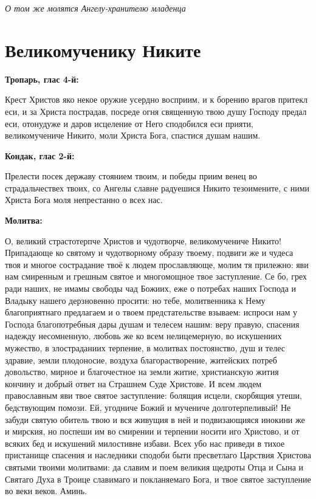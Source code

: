 \itshape О том же молятся Ангелу-хранителю младенца\normalfont{} 




 

\section{Великомученику Никите}
 
\bfseries Тропарь, глас 4-й:\normalfont{}


Крест Христов яко некое оружие усердно восприим, и к борению врагов притекл еси, и за Христа пострадав, посреде огня священную твою душу Господу предал еси, отонудуже и даров исцеление от Него сподобился еси прияти, великомучениче Никито, моли Христа Бога, спастися душам нашим.


\medskip
\bfseries Кондак, глас 2-й:\normalfont{}

Прелести посек державу стоянием твоим, и победы приим венец во страдальчествех твоих, со Ангелы славне радуешися Никито тезоимените, с ними Христа Бога моля непрестанно о всех нас.


\medskip
\bfseries Молитва:\normalfont{}


О, великий страстотерпче Христов и чудотворче, великомучениче Никито! Припадающе ко святому и чудотворному образу твоему, подвиги же и чудеса твоя и многое сострадание твоё к людем прославляюще, молим тя прилежно: яви нам смиренным и грешным святое и многомощное твое заступление. Се бо, грех ради наших, не имамы свободы чад Божиих, еже о потребах наших Господа и Владыку нашего дерзновенно просити: но тебе, молитвенника к Нему благоприятнаго предлагаем и о твоем предстательстве взываем: испроси нам у Господа благопотребныя дары душам и телесем нашим: веру правую, спасения надежду несомненную, любовь же ко всем нелицемерную, во искушениих мужество, в злостраданиих терпение, в молитвах постоянство, душ и телес здравие, земли плодоносие, воздуха благорастворение, житейских потреб довольство, мирное и благочестное на земли житие, христианскую жития кончину и добрый ответ на Страшнем Суде Христове. И всем людем православным яви твое святое заступление: болящия исцели, скорбящия утеши, бедствующим помози. Ей, угодниче Божий и мучениче долготерпеливый! Не забуди святую обитель твою и вся живущия в ней и подвизающияся инокини же и мирския, но поспеши им во смирении и терпении носити иго Христово, и от всяких бед и искушений милостивне избави. Всех убо нас приведи в тихое пристанище спасения и наследники сподоби быти пресветлаго Царствия Христова святыми твоими молитвами: да славим и поем великия щедроты Отца и Сына и Святаго Духа в Троице славимаго и покланяемаго Бога, и твое святое заступление во веки веков. Аминь. 

